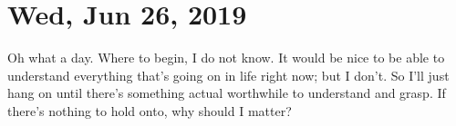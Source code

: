 \section{Wed, Jun 26, 2019}

Oh what a day. Where to begin, I do not know. It would be nice to be able to 
understand everything that's going on in life right now; but I don't. So I'll 
just hang on until there's something actual worthwhile to understand and grasp. 
If there's nothing to hold onto, why should I matter?
